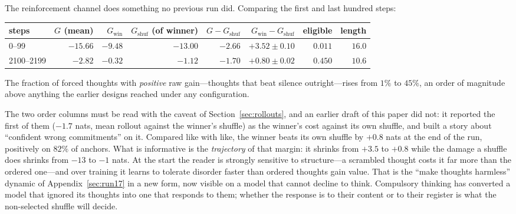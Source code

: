 \documentclass{article} %
\newcommand{\gain}{G}
\begin{document}
The reinforcement channel does something no previous run did. Comparing the first and last hundred steps:
\begin{center}\small
\begin{tabular}{lrrrrrrr}
\toprule
steps & $\gain$ (mean) & $\gain_{\mathrm{win}}$ & $\gain_{\mathrm{shuf}}$ (of winner) & $\gain - \gain_{\mathrm{shuf}}$ & $\gain_{\mathrm{win}} - \gain_{\mathrm{shuf}}$ & eligible & length \\
\midrule
0--99       & $-15.66$ & $-9.48$ & $-13.00$ & $-2.66$ & $+3.52 \pm 0.10$ & $0.011$ & $16.0$ \\
2100--2199  & $-2.82$  & $-0.32$ & $-1.12$  & $-1.70$ & $+0.80 \pm 0.02$ & $0.450$ & $10.6$ \\
\bottomrule
\end{tabular}
\end{center}
The fraction of forced thoughts with \emph{positive} raw gain---thoughts that beat silence outright---rises from $1\%$ to $45\%$, an order of magnitude above anything the earlier designs reached under any configuration.

The two order columns must be read with the caveat of Section~\ref{sec:rollouts}, and an earlier draft of this paper did not: it reported the first of them ($-1.7$ nats, mean rollout against the winner's shuffle) as the winner's cost against its own shuffle, and built a story about ``confident wrong commitments'' on it. Compared like with like, the winner beats its own shuffle by $+0.8$ nats at the end of the run, positively on $82\%$ of anchors. What is informative is the \emph{trajectory} of that margin: it shrinks from $+3.5$ to $+0.8$ while the damage a shuffle does shrinks from $-13$ to $-1$ nats. At the start the reader is strongly sensitive to structure---a scrambled thought costs it far more than the ordered one---and over training it learns to tolerate disorder faster than ordered thoughts gain value. That is the ``make thoughts harmless'' dynamic of Appendix~\ref{sec:run17} in a new form, now visible on a model that cannot decline to think. Compulsory thinking has converted a model that ignored its thoughts into one that responds to them; whether the response is to their content or to their register is what the non-selected shuffle will decide.
\end{document}
